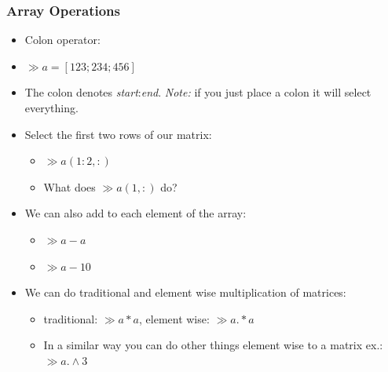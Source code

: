 \documentclass{beamer}
\newcommand{\I}{\textit}
\begin{document}


\begin{frame}
\frametitle{Array Operations} 

\begin{itemize} 
\item Colon operator:
\item $\gg a = [1 2 3 ; 2 3 4 ; 4 5 6]$
\item The colon denotes \I{start}:\I{end}. \I{Note:} if you just place a colon it will select everything.
\item Select the first two rows of our matrix: 
\begin{itemize}
\item $\gg a(1:2, :)$
\item  What does $ \gg a(1,:)$ do? 
\end{itemize}
\item We can also add to each element of the array: 
\begin{itemize}
\item $\gg a -a $ 
\item $\gg a - 10 $ 
\end{itemize}
\item We can do traditional and element wise multiplication of matrices: 
\begin{itemize}
\item traditional: $\gg a*a$, element wise: $\gg a.*a$
\item In a similar way you can do other things element wise to a matrix ex.: $\gg a.\wedge 3$
\end{itemize}
\end{itemize}
\end{frame}
\end{document}
